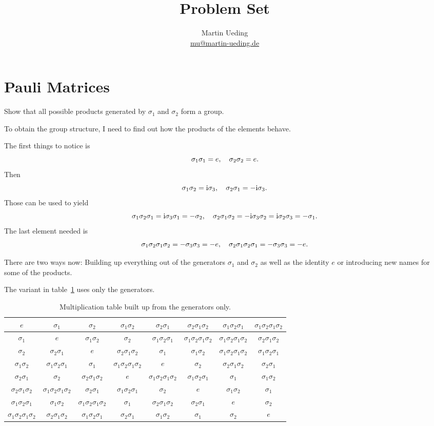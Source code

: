\documentclass[11pt, english, fleqn, DIV=15, headinclude, BCOR=1cm]{scrartcl}
\title{Problem Set \arabic{problemset}}
\author{
    Martin Ueding \\ \small{\href{mailto:mu@martin-ueding.de}{mu@martin-ueding.de}}
}
\begin{document}
\maketitle

\section{Pauli Matrices}

\newcommand\1{\sigma_1}
\newcommand\2{\sigma_2}
\newcommand\3{\sigma_3}

\begin{problem}
    Show that all possible products generated by $\1$ and $\2$ form a group.
\end{problem}

To obtain the group structure, I need to find out how the products of the
elements behave.

The first things to notice is
\[
    \1\1 = e
    \eqnsep
    \2\2 = e.
\]
Then
\[
    \1\2 = \iup \3
    \eqnsep
    \2\1 = - \iup \3.
\]
Those can be used to yield
\[
    \1\2\1 = \iup \3 \1 = - \2
    \eqnsep
    \2\1\2 = - \iup \3 \2 = \iup \2\3 = - \1.
\]
The last element needed is
\[
    \1\2\1\2 = - \3\3 = - e
    \eqnsep
    \2\1\2\1 = - \3\3 = - e.
\]

There are two ways now: Building up everything out of the generators $\1$ and
$\2$ as well as the identity $e$ or introducing new names for some of the
products.

The variant in table~\ref{tab:generators} uses only the generators.

\begin{landscape}
    \begin{table}[p]
        \centering
        \begin{tabular}{c|ccccccc}
            $e$ & $\1$ & $\2$ & $\1\2$ & $\2\1$ & $\2\1\2$ & $\1\2\1$ & $\1\2\1\2$ \\
            \midrule
            $\1$ & $e$ & $\1\2$ & $\2$ & $\1\2\1$ & $\1\2\1\2$ & $\1\2\1\2$ & $\2\1\2$ \\
            $\2$ & $\2\1$ & $e$ & $\2\1\2$ & $\1$ & $\1\2$ & $\1\2\1\2$ & $\1\2\1$ \\
            $\1\2$ & $\1\2\1$ & $\1$ & $\1\2\1\2$ & $e$ & $\2$ & $\2\1\2$ & $\2\1$ \\
            $\2\1$ & $\2$ & $\2\1\2$ & $e$ & $\1\2\1\2$ & $\1\2\1$ & $\1$ & $\1\2$ \\
            $\2\1\2$ & $\1\2\1\2$ & $\2\1$ & $\1\2\1$ & $\2$ & $e$ & $\1\2$ & $\1$ \\
            $\1\2\1$ & $\1\2$ & $\1\2\1\2$ & $\1$ & $\2\1\2$ & $\2\1$ & $e$ & $\2$ \\
            $\1\2\1\2$ & $\2\1\2$ & $\1\2\1$ & $\2\1$ & $\1\2$ & $\1$ & $\2$ & $e$ \\
        \end{tabular}
        \caption{%
            Multiplication table built up from the generators only.
        }
        \label{tab:generators}
    \end{table}
\end{landscape}
\end{document}
